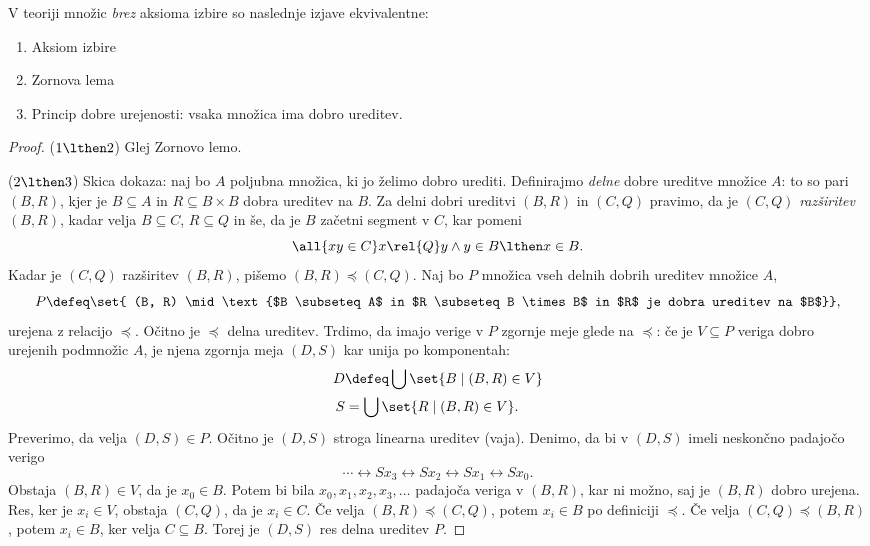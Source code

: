 \begin{izrek}
  V teoriji množic \emph{brez} aksioma izbire so naslednje izjave ekvivalentne:
  \begin{enumerate}
  \item Aksiom izbire
  \item Zornova lema
  \item Princip dobre urejenosti: vsaka množica ima dobro ureditev.
  \end{enumerate}
\end{izrek}

\begin{proof}
  ($1 \lthen 2$) Glej Zornovo lemo.

  ($2 \lthen 3$) Skica dokaza: naj bo $A$ poljubna množica, ki jo želimo dobro urediti.
  Definirajmo \emph{delne} dobre ureditve množice $A$: to so pari $(B,R)$, kjer je $B \subseteq A$
  in $R \subseteq B \times B$ dobra ureditev na $B$. Za delni dobri ureditvi $(B,R)$ in
  $(C,Q)$ pravimo, da je $(C,Q)$ \emph{razširitev} $(B,R)$, kadar velja $B \subseteq C$, $R \subseteq Q$ in
  še, da je $B$ začetni segment v $C$, kar pomeni
  \begin{equation*}
    \all{x y \in C} x \rel{Q} y \land y \in B \lthen x \in B.
  \end{equation*}
  Kadar je $(C,Q)$ razširitev $(B,R)$, pišemo $(B,R) \preceq (C,Q)$. Naj bo $P$ množica vseh delnih
  dobrih ureditev množice $A$,
  \begin{equation*}
    P \defeq \set{ (B, R) \mid \text{$B \subseteq A$ in $R \subseteq B \times B$ in $R$ je dobra ureditev na $B$}},
  \end{equation*}
  urejena z relacijo $\preceq$. Očitno je $\preceq$ delna ureditev. Trdimo, da imajo verige v
  $P$ zgornje meje glede na $\preceq$: če je $V \subseteq P$ veriga dobro urejenih podmnožic
  $A$, je njena zgornja meja $(D,S)$ kar unija po komponentah:
  \begin{align*}
    D &\defeq \bigcup \set{B \mid (B, R) \in V} \\
    S &= \bigcup \set{R \mid (B, R) \in V}.
  \end{align*}
  Preverimo, da velja $(D,S) \in P$. Očitno je $(D,S)$ stroga linearna ureditev
  (vaja). Denimo, da bi v $(D,S)$ imeli neskončno padajočo verigo
  \begin{equation*}
    \cdots \rel{S} x_3 \rel{S} x_2 \rel{S} x_1 \rel{S} x_0.
  \end{equation*}
  Obstaja $(B,R) \in V$, da je $x_0 \in B$. Potem bi bila $x_0, x_1, x_2, x_3, \ldots$
  padajoča veriga v $(B,R)$, kar ni možno, saj je $(B,R)$ dobro urejena. Res, ker
  je $x_i \in V$, obstaja $(C,Q)$, da je $x_i \in C$. Če velja $(B,R) \preceq (C,Q)$, potem
  $x_i \in B$ po definiciji $\preceq$. Če velja $(C,Q) \preceq (B,R)$, potem $x_i \in B$, ker velja
  $C \subseteq B$. Torej je $(D,S)$ res delna ureditev $P$.


\end{proof}
